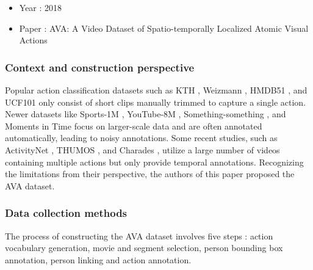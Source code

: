 \documentclass[10pt,onecolumn,letterpaper]{article}
\begin{document}
\begin{itemize}
	\item Year : 2018
	\item Paper : AVA: A Video Dataset of Spatio-temporally Localized Atomic Visual
	Actions \cite{AVA}
\end{itemize}

\subsubsection{\textbf{Context and construction perspective}}

Popular action classification datasets such as KTH \cite{KTH}, Weizmann
\cite{Weizmann}, HMDB51 \cite{HMDB51}, and UCF101 \cite{UCF101} only consist of
short clips manually trimmed to capture a single action. Newer datasets like
Sports-1M \cite{Sports1M}, YouTube-8M \cite{YouTube8M}, Something-something
\cite{somethingsomething}, and Moments in Time \cite{momentsintime} focus on
larger-scale data and are often annotated automatically, leading to noisy
annotations. Some recent studies, such as ActivityNet \cite{ActivityNet}, THUMOS
\cite{THUMOS}, and Charades \cite{Charades}, utilize a large number of videos
containing multiple actions but only provide temporal annotations. Recognizing
the limitations from their perspective, the authors of this paper proposed the
AVA dataset.

\subsubsection{Data collection methods}

The process of constructing the AVA dataset involves five steps : action
vocabulary generation, movie and segment selection, person bounding box
annotation, person linking and action annotation.
\end{document}
